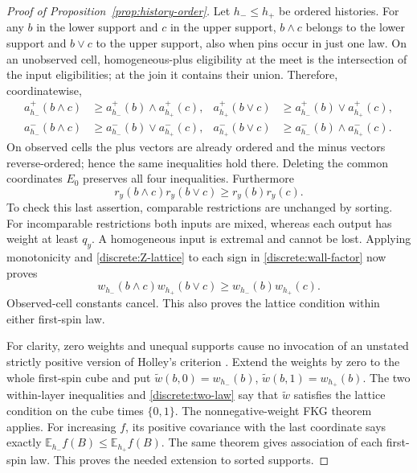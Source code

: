 \documentclass[11pt]{article}
\theoremstyle{definition}
\theoremstyle{remark}
\numberwithin{equation}{section}
\begin{document}
\begin{proof}[Proof of Proposition~\ref{prop:history-order}]
Let $h_-\le h_+$ be ordered histories. For any $b$ in the lower support and
$c$ in the upper support, $b\wedge c$ belongs to the lower support and
$b\vee c$ to the upper support, also when pins occur in just one law.
On an unobserved cell, homogeneous-plus eligibility at the meet is the
intersection of the input eligibilities; at the join it contains their
union. Therefore, coordinatewise,
\begin{align*}
 a_{h_-}^+(b\wedge c)&\ge a_{h_-}^+(b)\wedge a_{h_+}^+(c),&
 a_{h_+}^+(b\vee c)&\ge a_{h_-}^+(b)\vee a_{h_+}^+(c),\\
 a_{h_-}^-(b\wedge c)&\ge a_{h_-}^-(b)\vee a_{h_+}^-(c),&
 a_{h_+}^-(b\vee c)&\ge a_{h_-}^-(b)\wedge a_{h_+}^-(c).
\end{align*}
On observed cells the plus vectors are already ordered and the minus
vectors reverse-ordered; hence the same inequalities hold there. Deleting
the common coordinates $E_0$ preserves all four inequalities.
Furthermore
\[
 r_y(b\wedge c)r_y(b\vee c)\ge r_y(b)r_y(c).
\]
To check this last assertion, comparable restrictions are unchanged by
sorting. For incomparable restrictions both inputs are mixed, whereas
each output has weight at least $q_y$. A homogeneous input is extremal
and cannot be lost. Applying monotonicity and
\eqref{discrete:Z-lattice} to each sign in
\eqref{discrete:wall-factor} now proves
\begin{equation}\label{discrete:two-law}
 w_{h_-}(b\wedge c)w_{h_+}(b\vee c)
       \ge w_{h_-}(b)w_{h_+}(c).
\end{equation}
Observed-cell constants cancel. This also proves the lattice condition
within either first-spin law.

For clarity, zero weights and unequal supports cause no invocation of an
unstated strictly positive version of Holley's criterion
\cite{Holley1974}. Extend the weights by zero to the whole first-spin cube
and put $\widetilde w(b,0)=w_{h_-}(b)$,
$\widetilde w(b,1)=w_{h_+}(b)$. The two within-layer inequalities and
\eqref{discrete:two-law} say that $\widetilde w$ satisfies the lattice
condition on the cube times $\{0,1\}$. The nonnegative-weight FKG theorem
\cite{FKG1971} applies. For increasing $f$, its positive covariance with
the last coordinate says exactly
$\mathbb E_{h_-}f(B)\le\mathbb E_{h_+}f(B)$. The same theorem gives association of
each first-spin law. This proves the needed extension to sorted supports.


\end{proof}
\end{document}
